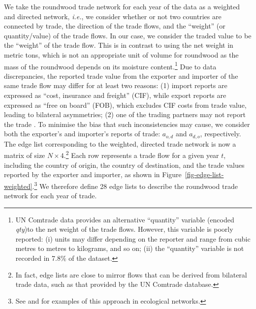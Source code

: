 \documentclass[
  authoryear,
  review,
  3p]{elsarticle}
\begin{document}
We take the roundwood trade network for each year of the data as a
weighted and directed network, \emph{i.e.}, we consider whether or not
two countries are connected by trade, the direction of the trade flows,
and the ``weight'' (or quantity/value) of the trade flows. In our case,
we consider the traded value to be the ``weight'' of the trade flow.
This is in contrast to using the net weight in metric tons, which is not
an appropriate unit of volume for roundwood as the mass of the roundwood
depends on its moisture content.\footnote{UN Comtrade data provides an
  alternative ``quantity'' variable (encoded \emph{qty})to the net
  weight of the trade flows. However, this variable is poorly reported:
  (i) units may differ depending on the reporter and range from cubic
  metres to metres to kilograms, and so on; (ii) the ``quantity''
  variable is not recorded in 7.8\% of the dataset.} Due to data
discrepancies, the reported trade value from the exporter and importer
of the same trade flow may differ for at least two reasons: (1) import
reports are expressed as ``cost, insurance and freight'' (CIF), while
export reports are expressed as ``free on board'' (FOB), which excludes
CIF costs from trade value, leading to bilateral asymmetries; (2) one of
the trading partners may not report the trade
\citep{CEPII:2010-23, rougieux2017forest, kallio2018reliability, chen2022advancing, mitikj2024bridging}.
To minimise the bias that such inconsistencies may cause, we consider
both the exporter's and importer's reports of trade: \(a_{o,d}\) and
\(a_{d,o}\), respectively. The edge list corresponding to the weighted,
directed trade network is now a matrix of size
\(N \times 4\).\footnote{In fact, edge lists are close to mirror flows
  that can be derived from bilateral trade data, such as that provided
  by the UN Comtrade database.} Each row represents a trade flow for a
given year \(t\), including the country of origin, the country of
destination, and the trade values reported by the exporter and importer,
as shown in Figure~\ref{fig-edge-list-weighted}.\footnote{See
  \citet{rayfield2011connectivity} and \citet{thompson2017loss} for
  examples of this approach in ecological networks.} We therefore define
28 edge lists to describe the roundwood trade network for each year of
trade.
\end{document}
